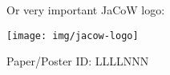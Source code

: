 \documentclass[a0paper,fleqn]{betterposter}
\newcommand{\fontsizecaption}{\fontsize{32.00}{45.33} \selectfont}
\begin{document}
{\vspace*{2.0em}

Or very important JaCoW logo:
\begin{center}
\texttt{[image: img/jacow-logo]}
\end{center}

\vspace*{14.0em}

\begin{flushright}
{\fontsizecaption Paper/Poster ID: LLLLNNN}
\end{flushright}

}
\end{document}
